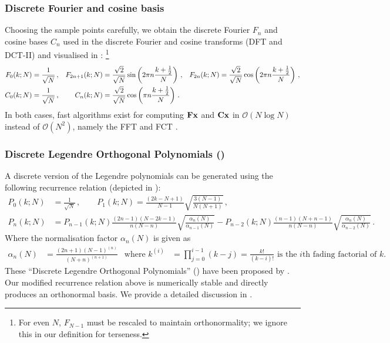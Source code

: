 \subsubsection{Discrete Fourier and cosine basis}
Choosing the sample points carefully, we obtain the discrete Fourier $F_n$ and cosine bases $C_n$ used in the discrete Fourier and cosine transforms (DFT and DCT-II) and visualised in :%
\footnote{
For even $N$, $F_{N - 1}$ must be rescaled to maintain orthonormality; we ignore this in our definition for terseness.
}
\begin{align}
  	F_0(k; N) &= \frac{1}{\sqrt{N}} \,, &
  	F_{2n + 1}(k; N) &= \frac{\sqrt{2}}{\sqrt{N}} \sin\left(
  		2 \pi n \frac{k + \frac{1}2}{N}\right) \,, &
  	F_{2n}(k; N) &= \frac{\sqrt{2}}{\sqrt{N}} \cos\left(
  		2 \pi n \frac{k + \frac{1}2}{N}\right) \,, \notag\\
  	C_0(k; N) &= \frac{1}{\sqrt{N}} \,, &
  	C_n(k; N) &= \frac{\sqrt{2}}{\sqrt{N}} \cos\left(\pi n \frac{k + \frac{1}2}{N}\right) \,.
  	\label{eqn:dft_dct}
\end{align}
In both cases, fast algorithms exist for computing $\mathbf{F} \mathbf{x}$ and $\mathbf{C} \mathbf{x}$ in $\mathcal{O}(N\log{N})$ instead of $\mathcal{O}(N^2)$, namely the FFT and FCT \citep[Chapter~12]{cooley1965algorithm,makhoul1980fast,press2007numerical}.

\subsubsection{Discrete Legendre Orthogonal Polynomials (\DLOPpl)}
A discrete version of the Legendre polynomials can be generated using the following recurrence relation (depicted in ):
\begin{align*}
  	P_{0}(k; N) &= \frac{1}{\sqrt{N}} \,, \quad\quad
  	P_{1}(k; N)  = \frac{(2 k - N + 1)}{N - 1} \sqrt{\frac{3 (N - 1)}{N (N + 1)}} \,, \\
  	P_{n}(k; N) &= P_{n - 1}(k; N) \frac{(2n - 1) (N - 2k - 1)}{n (N - n)} \sqrt{\frac{\alpha_{n}(N)}{\alpha_{n - 1}(N)}}
                   - P_{n - 2}(k; N) \frac{(n - 1) (N + n - 1)}{n (N - n)} \sqrt{\frac{\alpha_{n}(N)}{\alpha_{n - 2}(N)}} \,.
\end{align*}
Where the normalisation factor $\alpha_n(N)$ is given as
\begin{align*}
 	\alpha_n(N) &= \frac{(2n + 1) (N - 1)^{(n)}}{(N + n)^{(n + 1)}} & \text{where } k^{(i)} &= \prod_{j = 0}^{i - 1} (k - j) = \frac{k!}{(k - i)!} \text{ is the $i$th fading factorial of $k$.}
\end{align*}
These \enquote{Discrete Legendre Orthogonal Polynomials} (\DLOPpl) have been proposed by \citet{neuman1974discrete}.
Our modified recurrence relation above is numerically stable and directly produces an orthonormal basis.
We provide a detailed discussion in \citet{stockel2021discrete}.

